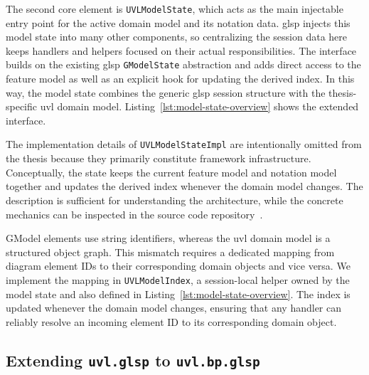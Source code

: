

The second core element is \texttt{UVLModelState}, which acts as the main injectable entry point for the active domain model and its notation data.
\gls{glsp} injects this model state into many other components, so centralizing the session data here keeps handlers and helpers focused on their actual responsibilities.
The interface builds on the existing \gls{glsp} \texttt{GModelState} abstraction and adds direct access to the feature model as well as an explicit hook for updating the derived index.
In this way, the model state combines the generic \gls{glsp} session structure with the thesis-specific \gls{uvl} domain model.
Listing~\ref{lst:model-state-overview} shows the extended interface.

The implementation details of \texttt{UVLModelStateImpl} are intentionally omitted from the thesis because they primarily constitute framework infrastructure.
Conceptually, the state keeps the current feature model and notation model together and updates the derived index whenever the domain model changes.
The description is sufficient for understanding the architecture, while the concrete mechanics can be inspected in the source code repository~\cite{ruider_xxnicksdaxxma-nick-ruider_2026}.

GModel elements use string identifiers, whereas the \gls{uvl} domain model is a structured object graph.
This mismatch requires a dedicated mapping from diagram element IDs to their corresponding domain objects and vice versa.
We implement the mapping in \texttt{UVLModelIndex}, a session-local helper owned by the model state and also defined in Listing~\ref{lst:model-state-overview}.
The index is updated whenever the domain model changes, ensuring that any handler can reliably resolve an incoming element ID to its corresponding domain object.

\subsection{Extending \texttt{uvl.glsp} to \texttt{uvl.bp.glsp}}
\label{subsec:impl_overview_bp_extension}



